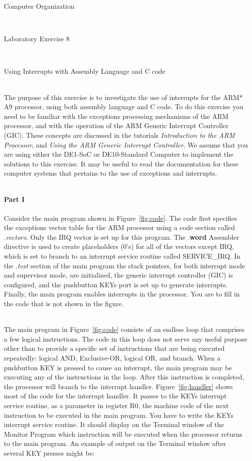 \documentclass[epsfig,10pt,fullpage]{article}
\newcommand{\LabNum}{8}
\begin{document}
\centerline{\huge Computer Organization}
~\\
\centerline{\huge Laboratory Exercise \LabNum}
~\\
\centerline{\large Using Interrupts with Assembly Language and C code}
~\\

\noindent
The purpose of this exercise is to investigate the use of interrupts for the ARM* A9
processor, using both assembly language and C code. To do this exercise you need to be familiar 
with the exceptions processing mechanisms of the ARM processor, and with the operation of
the ARM Generic Interrupt Controller (GIC). These concepts are discussed in the tutorials 
{\it Introduction to the ARM Processor}, and {\it Using the ARM Generic Interrupt
Controller}. We assume that you are using either the DE1-SoC or DE10-Standard Computer to 
implement the solutions to this exercise. It may be useful to read the documentation for
these computer systems that pertains to the use of exceptions and interrupts.

~\\
\noindent
{\bf Part I}
~\\
~\\
\noindent
Consider the main program shown in Figure~\ref{fig:code}. The code first specifies the
exceptions vector table for the ARM processor using a code section called .{\it vectors}.
Only the IRQ vector is set up for this program. The .{\bf word} Assembler directive is used to 
create placeholders (0's) for all of the vectors except IRQ, which is 
set to branch to an interrupt service routine called SERVICE\_IRQ.  
In the .{\it text} section of the main program the stack pointers, for both 
interrupt mode and supervisor mode, are initialized, the generic interrupt controller
(GIC) is configured, and the pushbutton KEYs port is set up to generate interrupts.
Finally, the main program enables interrupts in the processor.  You are to fill in the code that 
is not shown in the figure.  

~\\
\noindent
The main program in Figure~\ref{fig:code} consists of an endless loop that comprises 
a few logical instructions. The code in this loop does not serve any useful purpose other 
than to provide a specific set of instructions that are being executed repeatedly: logical
AND, Exclusive-OR, logical OR, and branch. When a pushbutton KEY is pressed to cause an 
interrupt, the main program may be executing any of the instructions in the loop. After 
this instruction is completed, the processor will branch to the interrupt handler. 
Figure~\ref{fig:handler} shows most of the code for the interrupt handler. It passes to 
the KEYs interrupt service routine, as a parameter in register R0, the machine code 
of the next instruction to be executed in the main program. You have to write the KEYs interrupt 
service routine. It should display on the Terminal window of the Monitor Program which 
instruction will be executed when the processor returns to the main program. 
An example of output on the Terminal window after several KEY presses might be:
\end{document}
